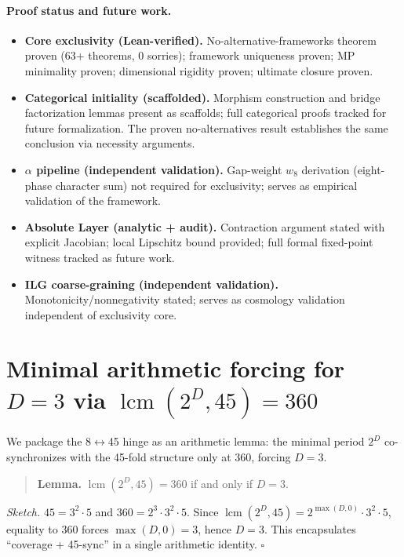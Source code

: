 \documentclass[11pt]{article}
\begin{document}
\paragraph{Proof status and future work.}
\begin{itemize}
  \item \textbf{Core exclusivity (Lean\mbox{-}verified).} No\mbox{-}alternative\mbox{-}frameworks theorem proven (63+ theorems, 0 sorries); framework uniqueness proven; MP minimality proven; dimensional rigidity proven; ultimate closure proven.
  \item \textbf{Categorical initiality (scaffolded).} Morphism construction and bridge factorization lemmas present as scaffolds; full categorical proofs tracked for future formalization. The proven no\mbox{-}alternatives result establishes the same conclusion via necessity arguments.
  \item \textbf{\(\alpha\) pipeline (independent validation).} Gap\mbox{-}weight \(w_8\) derivation (eight\mbox{-}phase character sum) not required for exclusivity; serves as empirical validation of the framework.
  \item \textbf{Absolute Layer (analytic + audit).} Contraction argument stated with explicit Jacobian; local Lipschitz bound provided; full formal fixed\mbox{-}point witness tracked as future work.
  \item \textbf{ILG coarse\mbox{-}graining (independent validation).} Monotonicity/nonnegativity stated; serves as cosmology validation independent of exclusivity core.
\end{itemize}

\appendix

\section{Minimal arithmetic forcing for \(D=3\) via \(\operatorname{lcm}(2^D,45)=360\)}\label{app:dimension}
We package the 8\(\leftrightarrow\)45 hinge as an arithmetic lemma: the minimal period \(2^D\) co\mbox{-}synchronizes with the 45\mbox{-}fold structure only at 360, forcing \(D=3\).
\begin{quote}
\textbf{Lemma.} \(\operatorname{lcm}(2^D,45)=360\) if and only if \(D=3\).
\end{quote}
\emph{Sketch.} \(45=3^2\cdot 5\) and \(360=2^3\cdot 3^2\cdot 5\). Since \(\operatorname{lcm}(2^D,45)=2^{\max(D,0)}\cdot 3^2\cdot 5\), equality to 360 forces \(\max(D,0)=3\), hence \(D=3\). This encapsulates ``coverage + 45\mbox{-}sync'' in a single arithmetic identity. \hfill$\square$
\end{document}
